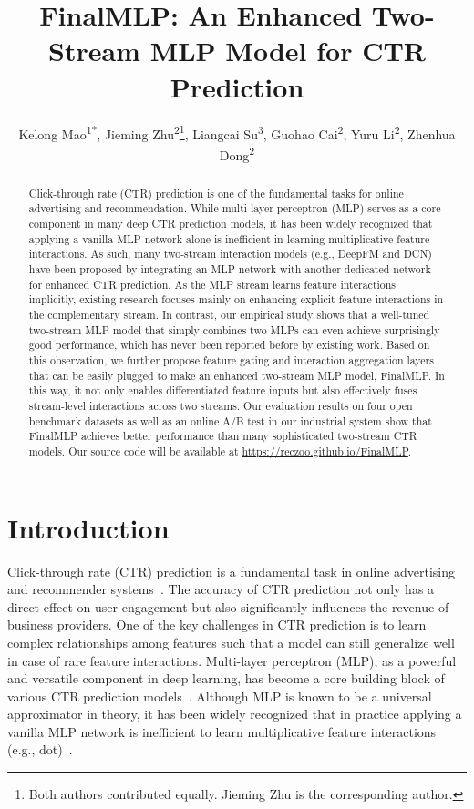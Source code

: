 \documentclass[letterpaper]{article} \usepackage{aaai23}  \usepackage{times}  \usepackage{helvet}  \usepackage{courier}  \usepackage[hyphens]{url}  \usepackage{graphicx} \urlstyle{rm} \def\UrlFont{\rm}  \usepackage{natbib}  \usepackage{caption} \frenchspacing  \setlength{\pdfpagewidth}{8.5in}  \setlength{\pdfpageheight}{11in}  \usepackage{algorithm}
\title{FinalMLP: An Enhanced Two-Stream MLP Model for CTR Prediction}
\author{
Kelong Mao\textsuperscript{\rm 1*}, 
    Jieming Zhu\textsuperscript{\rm 2}\thanks{Both authors contributed equally. Jieming Zhu is the corresponding author.},
    Liangcai Su\textsuperscript{\rm 3},
    Guohao Cai\textsuperscript{\rm 2},
    Yuru Li\textsuperscript{\rm 2},
    Zhenhua Dong\textsuperscript{\rm 2}
}
\begin{document}
\maketitle


\begin{abstract}
 Click-through rate (CTR) prediction is one of the fundamental tasks for online advertising and recommendation. While multi-layer perceptron (MLP) serves as a core component in many deep CTR prediction models, it has been widely recognized that applying a vanilla MLP network alone is inefficient in learning multiplicative feature interactions. As such, many two-stream interaction models (e.g., DeepFM and DCN) have been proposed by integrating an MLP network with another dedicated network for enhanced CTR prediction. As the MLP stream learns feature interactions implicitly, existing research focuses mainly on enhancing explicit feature interactions in the complementary stream. In contrast, our empirical study shows that a well-tuned two-stream MLP model that simply combines two MLPs can even achieve surprisingly good performance, which has never been reported before by existing work. Based on this observation, we further propose feature gating and interaction aggregation layers that can be easily plugged to make an enhanced two-stream MLP model, FinalMLP. In this way, it not only enables differentiated feature inputs but also effectively fuses stream-level interactions across two streams. Our evaluation results on four open benchmark datasets as well as an online A/B test in our industrial system show that FinalMLP achieves better performance than many sophisticated two-stream CTR models. Our source code will be available at \textcolor{magenta}{\url{https://reczoo.github.io/FinalMLP}}.




\end{abstract}

\section{Introduction}
\label{sec:intro}
Click-through rate (CTR) prediction is a fundamental task in online advertising and recommender systems~\cite{WideDeep,GBDT_LR}. 
The accuracy of CTR prediction not only has a direct effect on user engagement but also significantly influences the revenue of business providers. 
One of the key challenges in CTR prediction is to learn complex relationships among features such that a model can still generalize well in case of rare feature interactions. Multi-layer perceptron (MLP), as a powerful and versatile component in deep learning, has become a core building block of various CTR prediction models~\cite{fuxictr}. Although MLP is known to be a universal approximator in theory, it has been widely recognized that in practice applying a vanilla MLP network is inefficient to learn multiplicative feature interactions (e.g., dot)~\cite{DCN,DCN_V2,NCFvsMF}. 
\end{document}
